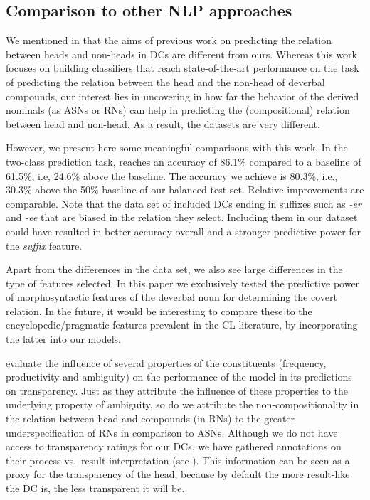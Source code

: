 \documentclass[output=paper]{langsci/langscibook}
\begin{document}
\subsection{Comparison to other NLP approaches}\label{sec:discussion-comparison}

We mentioned in  that the aims of previous work on predicting the relation between heads and non-heads in DCs are  different from ours. Whereas this work focuses on building classifiers that reach state-of-the-art performance on the task of predicting the relation between the head and the non-head of deverbal compounds, our interest lies in uncovering in how far the behavior of the derived nominals (as ASNs or RNs) can help in predicting the (compositional) relation between head and non-head. As a result, the datasets are very different. 

However, we present here some meaningful comparisons with  this work. In the two-class prediction task, \cite{lapata:02} reaches an accuracy of 86.1\% compared to a baseline of 61.5\%, i.e, 24.6\% above the baseline. The accuracy we achieve is 80.3\%, i.e., 30.3\% above the 50\% baseline of our balanced test set. Relative improvements are comparable. Note that the data set of \cite{lapata:02} included DCs ending in suffixes such as \textit{-er} and  \textit{-ee} that are  biased in the relation they select. Including them in our dataset could have resulted in better accuracy overall and a stronger predictive power for the \textit{suffix} feature. 

Apart from the differences in the data set, we also see large differences in the type of features selected. In this paper we exclusively 
tested the predictive power of morphosyntactic features of the deverbal noun for determining the covert relation. In the future, it would be interesting to compare these to the encyclopedic/pragmatic features prevalent in the CL literature, by incorporating the latter into our models.

\cite{SchulteImWaldeEtAl:16} evaluate the influence of several properties of the constituents (frequency, productivity and ambiguity) on the performance of the model in its predictions on transparency. Just as they attribute the influence of these properties to the underlying property of ambiguity, 
so do we attribute the non-compositionality in the relation between head and compounds (in RNs) to the greater underspecification of RNs in comparison to ASNs. Although we do not have access to transparency ratings for our DCs, we have gathered annotations on their process vs.\ result interpretation (see ). This information can be seen as a proxy for the transparency of the head, because by default the more result-like the DC is, the less transparent it will be.
\end{document}
